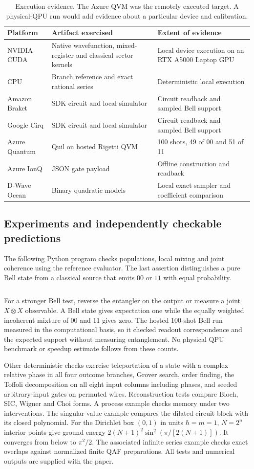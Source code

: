 \begin{table}[ht]
\centering\small
\begin{tabularx}{\linewidth}{@{}lXX@{}}
\toprule Platform & Artifact exercised & Extent of evidence\\\midrule
NVIDIA CUDA & Native wavefunction, mixed-register and classical-sector kernels & Local device execution on an RTX A5000 Laptop GPU\\
CPU & Branch reference and exact rational series & Deterministic local execution\\
Amazon Braket & SDK circuit and local simulator & Circuit readback and sampled Bell support\\
Google Cirq & SDK circuit and local simulator & Circuit readback and sampled Bell support\\
Azure Quantum & Quil on hosted Rigetti QVM & 100 shots, 49 of 00 and 51 of 11\\
Azure IonQ & JSON gate payload & Offline construction and readback\\
D-Wave Ocean & Binary quadratic models & Local exact sampler and coefficient comparison\\
\bottomrule
\end{tabularx}
\caption{Execution evidence. The Azure QVM was the remotely executed target. A physical-QPU run would add evidence about a particular device and calibration.}\label{tab:platforms}
\end{table}

\subsection{Experiments and independently checkable predictions}
The following Python program checks populations, local mixing and joint coherence using the reference evaluator. The last assertion distinguishes a pure Bell state from a classical source that emits $00$ or $11$ with equal probability.
\inputminted[fontsize=\footnotesize]{python}{../../examples/check_callable.py}
For a stronger Bell test, reverse the entangler on the output or measure a joint $X\otimes X$ observable. A Bell state gives expectation one while the equally weighted incoherent mixture of $00$ and $11$ gives zero. The hosted 100-shot Bell run measured in the computational basis, so it checked readout correspondence and the expected support without measuring entanglement. No physical QPU benchmark or speedup estimate follows from these counts.

Other deterministic checks exercise teleportation of a state with a complex relative phase in all four outcome branches, Grover search, order finding, the Toffoli decomposition on all eight input columns including phases, and seeded arbitrary-input gates on permuted wires. Reconstruction tests compare Bloch, SIC, Wigner and Choi forms. A process example checks memory under two interventions. The singular-value example compares the dilated circuit block with its closed polynomial. For the Dirichlet box $(0,1)$ in units $\hbar=m=1$, $N=2^n$ interior points give ground energy $2(N+1)^2\sin^2(\pi/[2(N+1)])$. It converges from below to $\pi^2/2$. The associated infinite series example checks exact overlaps against normalized finite QAF preparations. All tests and numerical outputs are supplied with the paper.
